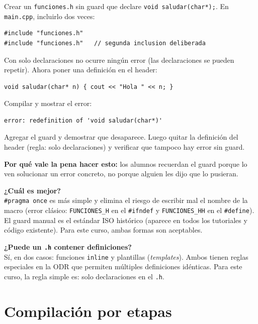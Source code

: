 \documentclass[12pt, oneside]{article}
\begin{document}
\begin{notaprofesor}
  Crear un \texttt{funciones.h} sin guard que declare \texttt{void saludar(char*);}.
  En \texttt{main.cpp}, incluirlo dos veces:
\begin{verbatim}
#include "funciones.h"
#include "funciones.h"   // segunda inclusion deliberada
\end{verbatim}
  Con solo declaraciones no ocurre ningún error (las declaraciones se pueden
  repetir).  Ahora poner una definición en el header:
\begin{verbatim}
void saludar(char* n) { cout << "Hola " << n; }
\end{verbatim}
  Compilar y mostrar el error:
\begin{verbatim}
error: redefinition of 'void saludar(char*)'
\end{verbatim}
  Agregar el guard y demostrar que desaparece.  Luego quitar la definición del
  header (regla: solo declaraciones) y verificar que tampoco hay error sin guard.
  \par\smallskip
  \textbf{Por qué vale la pena hacer esto:} los alumnos recuerdan el guard
  porque lo ven solucionar un error concreto, no porque alguien les dijo que
  lo pusieran.
\end{notaprofesor}

\begin{notaprofesor}
  \textbf{¿Cuál es mejor?}\\
  \texttt{\#pragma once} es más simple y elimina el riesgo de escribir mal
  el nombre de la macro (error clásico: \texttt{FUNCIONES\_H} en el
  \texttt{\#ifndef} y \texttt{FUNCIONES\_HH} en el \texttt{\#define}).
  El guard manual es el estándar ISO histórico (aparece en todos los
  tutoriales y código existente).  Para este curso, ambas formas son
  aceptables.

  \medskip
  \textbf{¿Puede un \texttt{.h} contener definiciones?}\\
  Sí, en dos casos: funciones \texttt{inline} y plantillas (\textit{templates}).
  Ambos tienen reglas especiales en la ODR que permiten múltiples
  definiciones idénticas.  Para este curso, la regla simple es:
  solo declaraciones en el \texttt{.h}.
\end{notaprofesor}

\section{Compilación por etapas}
\end{document}
